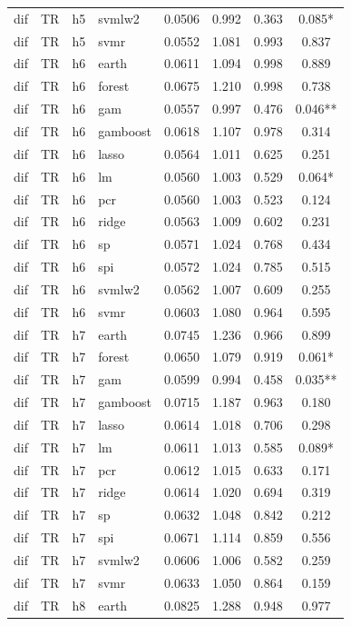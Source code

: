 \begin{ThreePartTable}
\begin{longtable}[t]{llclcccc}
dif & TR & h5 & svmlw2 & 0.0506 & 0.992 & 0.363 & 0.085*\\
dif & TR & h5 & svmr & 0.0552 & 1.081 & 0.993 & 0.837\\
\addlinespace
dif & TR & h6 & earth & 0.0611 & 1.094 & 0.998 & 0.889\\
dif & TR & h6 & forest & 0.0675 & 1.210 & 0.998 & 0.738\\
dif & TR & h6 & gam & 0.0557 & 0.997 & 0.476 & 0.046**\\
dif & TR & h6 & gamboost & 0.0618 & 1.107 & 0.978 & 0.314\\
dif & TR & h6 & lasso & 0.0564 & 1.011 & 0.625 & 0.251\\
dif & TR & h6 & lm & 0.0560 & 1.003 & 0.529 & 0.064*\\
dif & TR & h6 & pcr & 0.0560 & 1.003 & 0.523 & 0.124\\
dif & TR & h6 & ridge & 0.0563 & 1.009 & 0.602 & 0.231\\
dif & TR & h6 & sp & 0.0571 & 1.024 & 0.768 & 0.434\\
dif & TR & h6 & spi & 0.0572 & 1.024 & 0.785 & 0.515\\
dif & TR & h6 & svmlw2 & 0.0562 & 1.007 & 0.609 & 0.255\\
dif & TR & h6 & svmr & 0.0603 & 1.080 & 0.964 & 0.595\\
\addlinespace
dif & TR & h7 & earth & 0.0745 & 1.236 & 0.966 & 0.899\\
dif & TR & h7 & forest & 0.0650 & 1.079 & 0.919 & 0.061*\\
dif & TR & h7 & gam & 0.0599 & 0.994 & 0.458 & 0.035**\\
dif & TR & h7 & gamboost & 0.0715 & 1.187 & 0.963 & 0.180\\
dif & TR & h7 & lasso & 0.0614 & 1.018 & 0.706 & 0.298\\
dif & TR & h7 & lm & 0.0611 & 1.013 & 0.585 & 0.089*\\
dif & TR & h7 & pcr & 0.0612 & 1.015 & 0.633 & 0.171\\
dif & TR & h7 & ridge & 0.0614 & 1.020 & 0.694 & 0.319\\
dif & TR & h7 & sp & 0.0632 & 1.048 & 0.842 & 0.212\\
dif & TR & h7 & spi & 0.0671 & 1.114 & 0.859 & 0.556\\
dif & TR & h7 & svmlw2 & 0.0606 & 1.006 & 0.582 & 0.259\\
dif & TR & h7 & svmr & 0.0633 & 1.050 & 0.864 & 0.159\\
\addlinespace
dif & TR & h8 & earth & 0.0825 & 1.288 & 0.948 & 0.977\\

\end{longtable}
\end{ThreePartTable}
